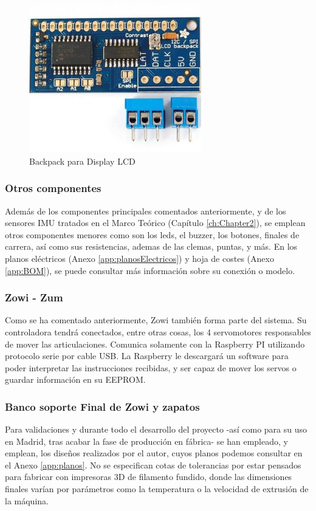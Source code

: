\begin{figure}
\centering
\includegraphics[width=75mm]{Figures/backpack}
\caption{Backpack para Display LCD}
\label{fig:backpack}
\end{figure}

\subsubsection{Otros componentes}

Además de los componentes principales comentados anteriormente, y de los sensores IMU tratados en el Marco Teórico (Capítulo \ref{ch:Chapter2}), se emplean otros componentes menores como son los leds, el buzzer, los botones, finales de carrera, así como sus resistencias, ademas de las clemas, puntas, y más. En los planos eléctricos (Anexo \ref{app:planosElectricos}) y hoja de costes (Anexo \ref{app:BOM}), se puede consultar más información sobre su conexión o modelo.

\subsubsection{Zowi - Zum}

Como se ha comentado anteriormente, Zowi también forma parte del sistema. Su controladora tendrá conectados, entre otras cosas, los 4 servomotores responsables de mover las articulaciones. Comunica solamente con la Raspberry PI utilizando protocolo serie por cable USB. La Raspberry le descargará un software para poder interpretar las instrucciones recibidas, y ser capaz de mover los servos o guardar información en su EEPROM.

\subsubsection{Banco soporte Final de Zowi y zapatos}

Para validaciones y durante todo el desarrollo del proyecto -así como para su uso en Madrid, tras acabar la fase de producción en fábrica- se han empleado, y emplean, los diseños realizados por el autor, cuyos planos podemos consultar en el Anexo \ref{app:planos}. No se especifican cotas de tolerancias por estar pensados para fabricar con impresoras 3D de filamento fundido, donde las dimensiones finales varían por parámetros como la temperatura o la velocidad de extrusión de la máquina.

